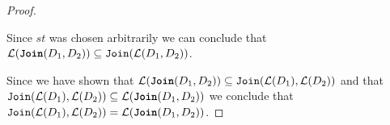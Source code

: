 \begin{proof}
\begin{itemize}
    \end{itemize}

    Since $st$ was chosen arbitrarily we can conclude that $\mathcal{L}(\texttt{\textbf{Join}}(D_1,D_2)) \subseteq \texttt{Join}(\mathcal{L}(D_1,D_2))$.

    Since we have shown that $\mathcal{L}(\texttt{\textbf{Join}}(D_1,D_2)) \subseteq \texttt{Join}(\mathcal{L}(D_1),\mathcal{L}(D_2))$ and that $\texttt{Join}(\mathcal{L}(D_1),\mathcal{L}(D_2)) \subseteq \mathcal{L}(\texttt{\textbf{Join}}(D_1,D_2))$ we conclude that $\texttt{Join}(\mathcal{L}(D_1),\mathcal{L}(D_2)) = \mathcal{L}(\texttt{\textbf{Join}}(D_1,D_2))$.
     
\end{proof}








